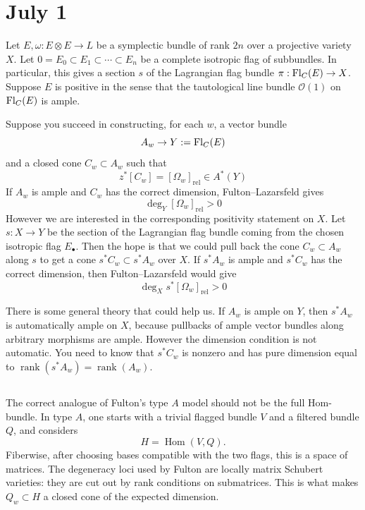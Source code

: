 \documentclass[12pt]{article}
\begin{document}
\section{July 1}
Let $E,\omega:E\otimes E\to L$ be a symplectic bundle of rank $2n$ over a projective variety $X$. Let $0=E_0\subset E_1\subset\cdots\subset E_n$ be a complete isotropic flag of subbundles. In particular, this gives a section $s$ of the Lagrangian flag bundle $\pi:\operatorname{Fl}_C(E)\to X$. Suppose $E$ is positive in the sense that the tautological line bundle $\mathcal O(1)$ on $\operatorname{Fl}_C(E)$ is ample.

Suppose you succeed in constructing, for each $w$, a vector bundle
\[
    A_w\to Y:=\operatorname{Fl}_C(E)
\]
and a closed cone $C_w\subset A_w$ such that
\[z^*[C_w]=[\Omega_w]_{\mathrm{rel}}\in A^*(Y)\]
If $A_w$ is ample and $C_w$ has the correct dimension, Fulton–Lazarsfeld gives
\[\deg_Y [\Omega_w]_{\mathrm{rel}}>0\]
However we are interested in the corresponding positivity statement on $X$. Let $s:X\to Y$ be the section of the Lagrangian flag bundle coming from the chosen isotropic flag $E_\bullet$. Then the hope is that we could pull back the cone $C_w \subset A_w$ along $s$ to get a cone $s^*C_w\subset s^*A_w$ over $X$. If $s^*A_w$ is ample and $s^*C_w$ has the correct dimension, then Fulton–Lazarsfeld would give
\[\deg_X s^*[\Omega_w]_{\mathrm{rel}}>0\]

There is some general theory that could help us.
If $A_w$ is ample on $Y$, then $s^*A_w$ is automatically ample on $X$, because pullbacks of ample vector bundles along arbitrary morphisms are ample. However the dimension condition is not automatic. You need to know that $s^*C_w$ is nonzero and has pure dimension equal to $\operatorname{rank}(s^*A_w)=\operatorname{rank}(A_w)$.


\subsection{}

The correct analogue of Fulton's type $A$ model should not be the full Hom-bundle. In type $A$, one starts with a trivial flagged bundle $V$ and a filtered bundle $Q$, and considers
\[
    H=\operatorname{Hom}(V,Q).
\]
Fiberwise, after choosing bases compatible with the two flags, this is a space of matrices. The degeneracy loci used by Fulton are locally matrix Schubert varieties: they are cut out by rank conditions on submatrices. This is what makes $Q_w\subset H$ a closed cone of the expected dimension.
\end{document}
